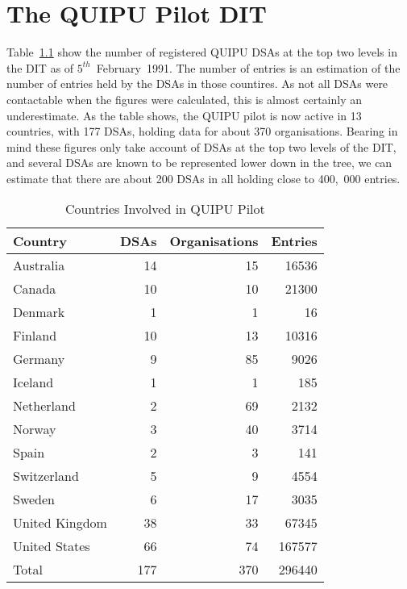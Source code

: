 

\chapter{The QUIPU Pilot DIT}
Table~\ref{pilot:root} show the number of registered QUIPU DSAs at the top two
levels in the DIT as of 
$5^{th}$~February~1991.
The number of entries is an estimation of the number of entries held by 
the DSAs in those countires.  As not all DSAs were contactable when the figures
were calculated, this is almost certainly an underestimate.
As the table shows, the QUIPU pilot is now active in 13 countries,
with 177 DSAs, holding data for about 370 organisations.
Bearing in mind these figures only take account of DSAs at the top two 
levels of the DIT, and several DSAs are known to be represented lower down
in the tree, we can estimate that there are about 200 DSAs in all holding
close to 400,~000 entries.


\begin{table}[hp]
\caption{Countries Involved in QUIPU Pilot }
\label{pilot:root}
\begin{center}
\begin{tabular}{||l|r|r|r||}\hline\hline
Country & DSAs & Organisations & Entries \\ \hline
Australia & 14 & 15 & 16536 \\
Canada & 10 & 10 & 21300 \\
Denmark & 1 & 1 & 16 \\
Finland & 10 & 13 & 10316 \\
Germany & 9 & 85 & 9026 \\
Iceland & 1 & 1 & 185 \\
Netherland & 2 & 69 & 2132 \\
Norway & 3 & 40 & 3714 \\
Spain & 2 & 3 & 141 \\
Switzerland & 5 & 9 & 4554 \\
Sweden & 6 & 17 & 3035 \\
United Kingdom & 38 & 33 & 67345 \\
United States & 66 & 74 & 167577 \\
\hline
Total & 177 & 370 & 296440 \\
\hline\hline
\end{tabular}
\end{center}
\end{table}

\pagebreak

